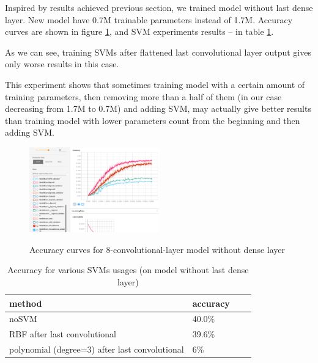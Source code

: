 \documentclass[a4paper]{article}
\begin{document}
Inspired by results achieved previous section,
we trained model without last dense layer.
New model have 0.7M trainable parameters instead of 1.7M.
Accuracy curves are shown in figure \ref{fig:noDense},
and SVM experiments results -- in table \ref{table:svm2}.

As we can see, training SVMs after flattened last convolutional
layer output gives only worse results in this case.

This experiment shows that sometimes training model with a certain
amount of training parameters, then removing more than a half
of them (in our case decreasing from 1.7M to 0.7M) and adding SVM,
may actually give better results than training model with lower
parameters count from the beginning and then adding SVM.

\begin{figure}[!hbt]
    \centering
    \includegraphics[page=2,width=0.5\textwidth]{noDense.png}
    \label{fig:noDense}
    \caption[]{Accuracy curves for 8-convolutional-layer model without dense layer}
\end{figure}

\begin{table}[!hbt]
    \caption{Accuracy for various SVMs usages (on model without last dense layer)
    \label{table:svm2}
    }
\begin{center}
    \begin{tabular}{| l | l | l | l |}
    \hline
    method&accuracy \\
    \hline
        noSVM & 40.0\% \\
        RBF after last convolutional & 39.6\% \\
        polynomial (degree=3) after last convolutional & 6\% \\
    \hline
    \end{tabular}
\end{center}
\end{table}
\end{document}
